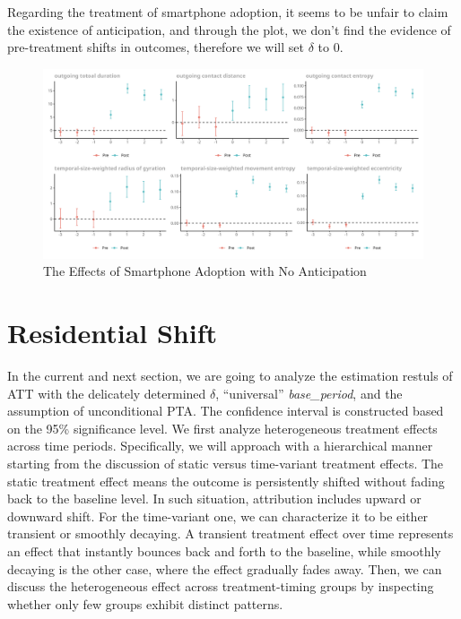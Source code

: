 Regarding the treatment of smartphone adoption, it seems to be unfair to claim the existence of anticipation, and through the plot, we don't find the evidence of pre-treatment shifts in outcomes, therefore we will set $\delta$ to 0.

\begin{figure}[h!]
\centering
\caption{The Effects of Smartphone Adoption with No Anticipation}
\vspace{0.1cm}

\includegraphics[width=1\textwidth]{figures/csdid/inspect_delta/smartphone_adoption.png}

\label{fig:select_delta_smartphone_adoption}
\end{figure}

\clearpage\newpage
\section{Residential Shift}\label{main_res_residential_shift}
In the current and next section, we are going to analyze the estimation restuls of ATT with the delicately determined \( \delta \), ``universal'' \textit{base\_period}, and the assumption of unconditional PTA. The confidence interval is constructed based on the 95\% significance level. We first analyze heterogeneous treatment effects across time periods. Specifically, we will approach with a hierarchical manner starting from the discussion of static versus time-variant treatment effects. The static treatment effect means the outcome is persistently shifted without fading back to the baseline level. In such situation, attribution includes upward or downward shift. For the time-variant one, we can characterize it to be either transient or smoothly decaying. A transient treatment effect over time represents an effect that instantly bounces back and forth to the baseline, while smoothly decaying is the other case, where the effect gradually fades away. Then, we can discuss the heterogeneous effect across treatment-timing groups by inspecting whether only few groups exhibit distinct patterns.


